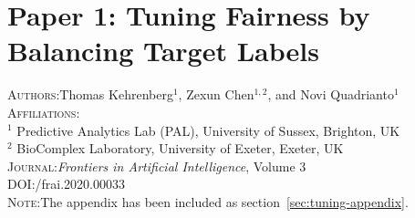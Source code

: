 \chapter{Paper 1: Tuning Fairness by Balancing Target Labels}\label{ch:paper1}

% 

% 






% 

\textsc{Authors}:\;\;Thomas Kehrenberg$^1$, Zexun Chen$^{1,2}$, and Novi Quadrianto$^1$ \\
\textsc{Affiliations}:\\
$^1$ Predictive Analytics Lab (PAL), University of Sussex, Brighton, UK\\
$^2$ BioComplex Laboratory, University of Exeter, Exeter, UK \\
\textsc{Journal}:\;\;\textit{Frontiers in Artificial Intelligence}, Volume 3 \\
\textsc{DOI}:\;/frai.2020.00033 \\
\textsc{Note}:\;\;The appendix has been included as section~\ref{sec:tuning-appendix}.

